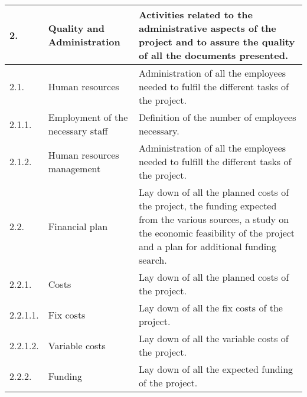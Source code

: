 \begin{longtable}[H]{l >{\raggedright\arraybackslash}p{4cm} p{8cm}}
	\midrule
	
	2. & Quality and Administration & Activities related to the administrative aspects of the project and to assure the quality of all the documents presented.\vspace{0.2cm} \\
	
	\midrule
	
	2.1. & Human resources & Administration of all the employees needed to fulfil the different tasks of the project.\vspace{0.2cm} \\
	
	\midrule
	
	2.1.1. & Employment of the necessary staff & Definition of the number of employees necessary.\vspace{0.2cm} \\
	
	\midrule
	
	2.1.2. & Human resources management & Administration of all the employees needed to fulfill the different tasks of the project.\vspace{0.2cm} \\
	
	\midrule
	
	2.2. & Financial plan & Lay down of all the planned costs of the project, the funding expected from the various sources, a study on the economic feasibility of the project and a plan for additional funding search.\vspace{0.2cm} \\
	
	\midrule
	
	2.2.1. & Costs & Lay down of all the planned costs of the project.\vspace{0.2cm} \\
	
	\midrule
	
	2.2.1.1. & Fix costs & Lay down of all the fix costs of the project.\vspace{0.2cm} \\
	
	\midrule
	
	2.2.1.2. & Variable costs & Lay down of all the variable costs of the project.\vspace{0.2cm} \\
	
	\midrule
	
	2.2.2. & Funding & Lay down of all the expected funding of the project.\vspace{0.2cm} \\
	

\end{longtable}
